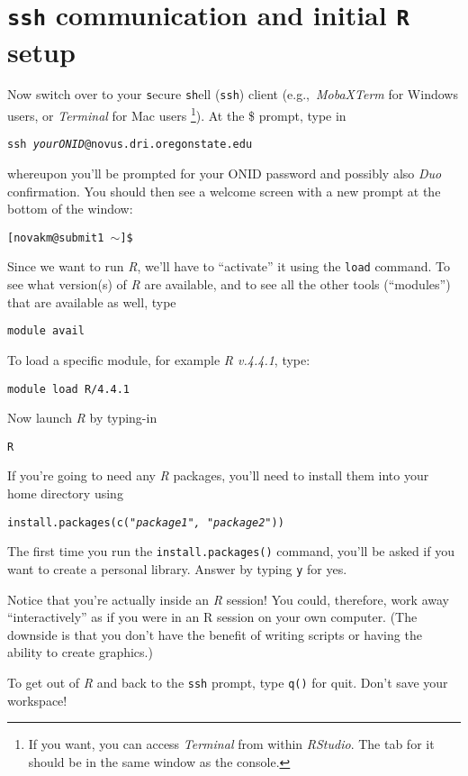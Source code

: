 \documentclass[12pt,letterpaper]{article}
\begin{document}
\section{\texttt{ssh} communication and initial \texttt{R} setup}
Now switch over to your \texttt{s}ecure \texttt{sh}ell (\texttt{ssh}) client (e.g.,~\emph{MobaXTerm} for Windows users, or \emph{Terminal} for Mac users
\unskip
\footnote{If you want, you can access \emph{Terminal} from within \emph{RStudio}. 
	The tab for it should be in the same window as the console.}).
At the \$ prompt, type in

\texttt{ssh \emph{yourONID}@novus.dri.oregonstate.edu}

\noindent
whereupon you'll be prompted for your ONID password and possibly also \textit{Duo} confirmation.
You should then see a welcome screen with a new prompt at the bottom of the window:

\texttt{[novakm@submit1 $\sim$]\$}

\noindent
Since we want to run \emph{R}, we'll have to ``activate'' it using the \texttt{load} command.
To see what version(s) of \emph{R} are available, and to see all the other tools (``modules'') that are available as well, type

\texttt{module avail}

\noindent
To load a specific module, for example \emph{R v.4.4.1}, type:

\texttt{module load R/4.4.1}

 \noindent
 Now launch \emph{R} by typing-in

 \texttt{R}

 \noindent
 If you're going to need any \emph{R} packages, you'll need to install them into your home directory using

 \texttt{install.packages(c("\emph{package1", "package2"}))}

 \noindent
The first time you run the \texttt{install.packages()} command, you'll be asked if you want to create a personal library.
Answer by typing \texttt{y} for yes.

\noindent
Notice that you're actually inside an \emph{R} session! 
You could, therefore, work away ``interactively'' as if you were in an R session on your own computer.
(The downside is that you don't have the benefit of writing scripts or having the ability to create graphics.)

To get out of \emph{R} and back to the \texttt{ssh} prompt, type \texttt{q()} for quit.
Don't save your workspace!
\end{document}
